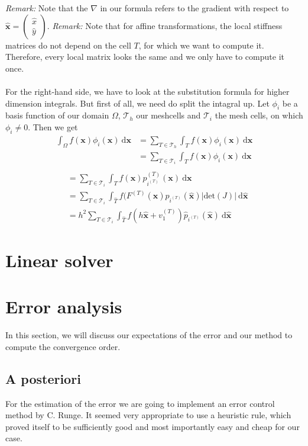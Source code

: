 \documentclass[a4paper,12pt]{report}
\begin{document}
\textit{Remark:} Note that the $\nabla$ in our formula refers to the gradient with respect to $\bm{\hat x}=\begin{pmatrix} \hat x \\ \hat y\end{pmatrix}$.
\textit{Remark:} Note that for affine transformations, the local stiffness matrices do not depend on the cell $T$, for which we want to compute it. Therefore, every local matrix looks the same and we only have to compute it once.
\\ \\
For the right-hand side, we have to look at the substitution formula for higher dimension integrals. But first of all, we need do split the intagral up. Let $\phi_i$ be a basis function of our domain $\Omega$, $\mathscr{T}_h$ our meshcells and $\mathscr{T}_i$ the mesh cells, on which $\phi_i \neq 0$. Then we get
\begin{align*}
\int_{\Omega}f(\bm{x})\phi_i(\bm{x})\ \mbox{d}\bm{x}&=\sum_{T\in\mathscr{T}_h} \int_Tf(\bm{x})\phi_i(\bm{x})\ \mbox{d}\bm{x} \\
													&=\sum_{T\in\mathscr{T}_i} \int_Tf(\bm{x})\phi_i(\bm{x})\ \mbox{d}\bm{x} \\
\end{align*}
\begin{align*}
													&=\sum_{T\in\mathscr{T}_i} \int_Tf(\bm{x})p^{(T)}_{i^{(T)}}(\bm{x})\ \mbox{d}\bm{x} \\
													&=\sum_{T\in\mathscr{T}_i} \int_{\hat T}f(F^{(T)}(\bm{\hat x})\hat p_{i^{(T)}}(\bm{\hat x})|\mbox{det}(J)|\ \mbox{d}\bm{\hat x} \\
													&=h^2\sum_{T\in\mathscr{T}_i} \int_{\hat T}f(h\bm{\hat x}+v^{(T)}_1)\hat p_{i^{(T)}}(\bm{\hat x})\ \mbox{d}\bm{\hat x}						
\end{align*}

\section{Linear solver}

\section{Error analysis}

In this section, we will discuss our expectations of the error and our method to compute the convergence order. \\

\subsection{A posteriori}
For the estimation of the error we are going to implement an error control method by C. Runge. It seemed very appropriate to use a heuristic rule, which proved itself to be sufficiently good and most importantly easy and cheap for our case.\\
\end{document}
